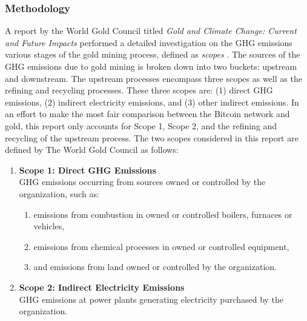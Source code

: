 \subsubsection{Methodology}
A report by the World Gold Council titled \textit{Gold and Climate Change: Current and Future Impacts} performed a detailed investigation on the GHG emissions various stages of the gold mining process, defined as \textit{scopes} \cite{gold-report}.
The sources of the GHG emissions due to gold mining is broken down into two buckets: upstream and downstream.
The upstream processes encompass three scopes as well as the refining and recycling processes. 
These three scopes are: (1) direct GHG emissions, (2) indirect electricity emissions, and (3) other indirect emissions.
In an effort to make the most fair comparison between the Bitcoin network and gold, this report only accounts for Scope 1, Scope 2, and the refining and recycling of the upstream process.
The two scopes considered in this report are defined by The World Gold Council as follows:

\begin{enumerate}
  \item \textbf{Scope 1: Direct GHG Emissions} \\
    GHG emissions occurring from sources owned or controlled by the organization, such as:

    \begin{enumerate}
      \item emissions from combustion in owned or controlled boilers, furnaces or vehicles,
      \item emissions from chemical processes in owned or controlled equipment,
      \item and emissions from land owned or controlled by the organization.
    \end{enumerate}

  \item \textbf{Scope 2: Indirect Electricity Emissions} \\
    GHG emissions at power plants generating electricity  purchased by the organization.
\end{enumerate}

